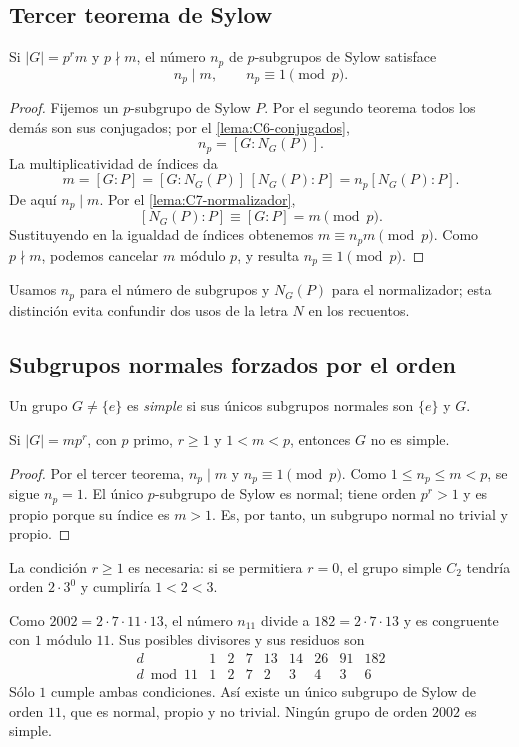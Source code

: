 \subsection{Tercer teorema de Sylow}\label{tema:7-2-3}
\begin{teo}\label{teo:C7-sylow-III}
Si $|G|=p^r m$ y $p\nmid m$, el número $n_p$ de $p$-subgrupos de Sylow satisface
\[
n_p\mid m,\qquad n_p\equiv1\pmod p.
\]
\end{teo}
\begin{proof}
Fijemos un $p$-subgrupo de Sylow $P$. Por el segundo teorema todos los demás son sus conjugados; por el \cref{lema:C6-conjugados},
\[
n_p=[G:N_G(P)].
\]
La multiplicatividad de índices da
\[
m=[G:P]=[G:N_G(P)]\,[N_G(P):P]
=n_p[N_G(P):P].
\]
De aquí $n_p\mid m$. Por el \cref{lema:C7-normalizador},
\[
[N_G(P):P]\equiv[G:P]=m\pmod p.
\]
Sustituyendo en la igualdad de índices obtenemos $m\equiv n_pm\pmod p$. Como $p\nmid m$, podemos cancelar $m$ módulo $p$, y resulta $n_p\equiv1\pmod p$.
\end{proof}
Usamos $n_p$ para el número de subgrupos y $N_G(P)$ para el normalizador; esta distinción evita confundir dos usos de la letra $N$ en los recuentos.

\subsection{Subgrupos normales forzados por el orden}\label{tema:7-3-1}
\begin{defi}
Un grupo $G\ne\{e\}$ es \emph{simple} si sus únicos subgrupos normales son $\{e\}$ y $G$.
\end{defi}

\begin{prop}\label{prop:C7-no-simple}
Si $|G|=mp^r$, con $p$ primo, $r\ge1$ y $1<m<p$, entonces $G$ no es simple.
\end{prop}
\begin{proof}
Por el tercer teorema, $n_p\mid m$ y $n_p\equiv1\pmod p$. Como $1\le n_p\le m<p$, se sigue $n_p=1$. El único $p$-subgrupo de Sylow es normal; tiene orden $p^r>1$ y es propio porque su índice es $m>1$. Es, por tanto, un subgrupo normal no trivial y propio.
\end{proof}
\begin{obs}
La condición $r\ge1$ es necesaria: si se permitiera $r=0$, el grupo simple $C_2$ tendría orden $2\cdot3^0$ y cumpliría $1<2<3$.
\end{obs}

\begin{ejem}[Orden $2002$]
Como $2002=2\cdot7\cdot11\cdot13$, el número $n_{11}$ divide a $182=2\cdot7\cdot13$ y es congruente con $1$ módulo $11$. Sus posibles divisores y sus residuos son
\[
\begin{array}{c|rrrrrrrr}
d&1&2&7&13&14&26&91&182\\\hline
d\bmod11&1&2&7&2&3&4&3&6
\end{array}
\]
Sólo $1$ cumple ambas condiciones. Así existe un único subgrupo de Sylow de orden $11$, que es normal, propio y no trivial. Ningún grupo de orden $2002$ es simple.
\end{ejem}

